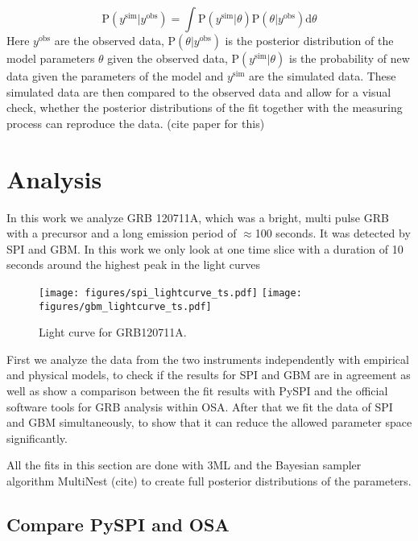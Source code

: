 \documentclass[twocolumn]{aa}
\begin{document}
\begin{equation}
  \textrm{P}(y^{\textrm{sim}}|y^{\textrm{obs}}) = \int \textrm{P}(y^{\textrm{sim}}|\theta) \textrm{P}(\theta|y^{\textrm{obs}}) \mathrm{d}\theta
  \label{eq:ppc}
\end{equation}
\noindent
Here $y^{\textrm{obs}}$ are the observed data, $\textrm{P}(\theta|y^{\textrm{obs}})$ is the posterior distribution of the model parameters $\theta$ given the observed data, $\textrm{P}(y^{\textrm{sim}}|\theta)$ is the probability of new data given the parameters of the model and $y^{\textrm{sim}}$ are the simulated data. These simulated data are then compared to the observed data and allow for a visual check, whether the posterior distributions of the fit together with the measuring process can reproduce the data. (cite paper for this)
\section{Analysis}

In this work we analyze GRB 120711A, which was a bright, multi pulse GRB with a precursor and a long emission period of $\approx$100 seconds. It was detected by SPI and GBM. In this work we only look at one time slice with a duration of 10 seconds around the highest peak in the light curves

\begin{figure}
  \begin{centering}
    \texttt{[image: figures/spi\_lightcurve\_ts.pdf]}
    \texttt{[image: figures/gbm\_lightcurve\_ts.pdf]}
    \label{fig:time_selection}
    \caption{Light curve for GRB120711A.}
  \end{centering}
\end{figure}


First we analyze the data from the two instruments independently with empirical and physical models, to check if the results for SPI and GBM are in agreement as well as show a comparison between the fit results with PySPI and the official software tools for GRB analysis within OSA. After that we fit the data of SPI and GBM simultaneously, to show that it can reduce the allowed parameter space significantly.

All the fits in this section are done with 3ML and the Bayesian sampler algorithm MultiNest (cite) to create full posterior distributions of the parameters.

\subsection{Compare PySPI and OSA}
\end{document}
